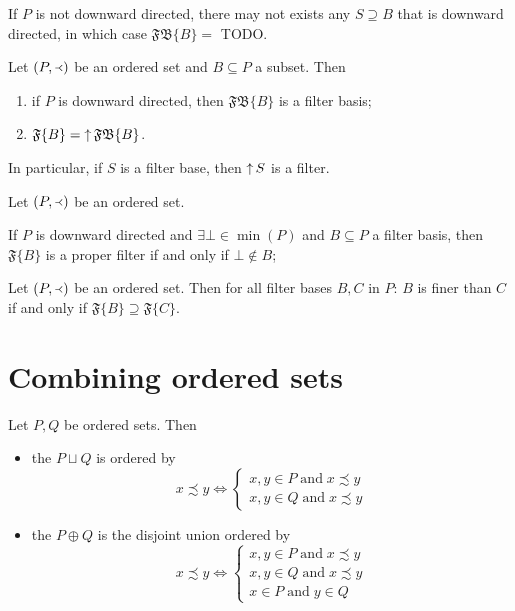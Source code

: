 If $P$ is not downward directed, there may not exists any $S \supseteq B$ that is downward directed, in which case $\mathfrak{FB}\{B\} =$ TODO.

\begin{proposition}
Let $\left( P,\Yleft \right)$ be an ordered set and $B\subseteq P$ a subset. Then
\begin{enumerate}
\item if $P$ is downward directed, then $\mathfrak{FB}\{B\}$ is a filter basis;
\item $\mathfrak{F}\{B\} = \mathop{\uparrow}\mathfrak{FB}\{B\}$.
\end{enumerate}
\end{proposition}
In particular, if $S$ is a filter base, then $\mathop{\uparrow} S$ is a filter.

\begin{lemma}
Let $\left( P,\Yleft \right)$ be an ordered set.

If $P$ is downward directed and $\exists \bot \in \min(P)$ and $B \subseteq P$ a filter basis, then $\mathfrak{F}\{B\}$ is a proper filter \textup{if and only if} $\bot \notin B$; 
\end{lemma}

\begin{proposition}
Let $\left( P,\Yleft \right)$ be an ordered set. Then for all filter bases $B,C$ in $P$: $B$ is finer than $C$ \textup{if and only if} $\mathfrak{F}\{B\} \supseteq \mathfrak{F}\{C\}$.
\end{proposition}

\section{Combining ordered sets}
\begin{definition}
Let $P,Q$ be ordered sets. Then
\begin{itemize}
\item the  $P\sqcup Q$ is ordered by
\[ x\precsim y \iff \begin{cases}
x,y\in P \;\text{and}\; x\precsim y \\
x,y\in Q \;\text{and}\; x\precsim y
\end{cases} \]
\item the  $P\oplus Q$ is the disjoint union ordered by
\[ x\precsim y \iff \begin{cases}
x,y\in P \;\text{and}\; x\precsim y \\
x,y\in Q \;\text{and}\; x\precsim y \\
x\in P \;\text{and}\; y\in Q
\end{cases} \]
\end{itemize}
\end{definition}

